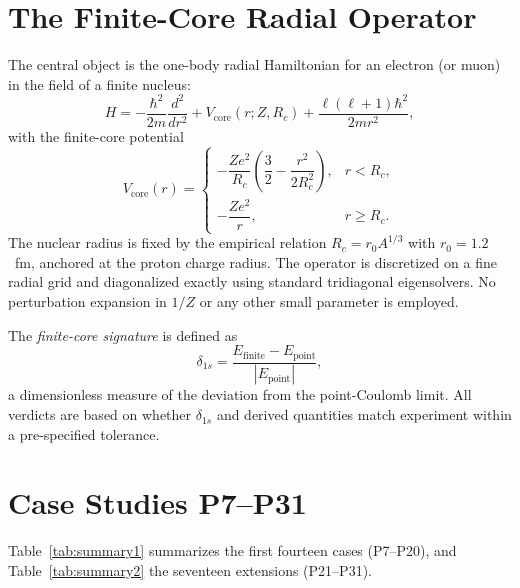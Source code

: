 \documentclass[11pt,a4paper]{article}
\begin{document}
\section{The Finite-Core Radial Operator}
\label{sec:operator}

The central object is the one-body radial Hamiltonian for an electron (or muon) in the field of a finite nucleus:
\begin{equation}
H = -\frac{\hbar^2}{2m}\frac{d^2}{dr^2} + V_{\text{core}}(r; Z, R_c) + \frac{\ell(\ell+1)\hbar^2}{2mr^2},
\end{equation}
with the finite-core potential
\begin{equation}
V_{\text{core}}(r) =
\begin{cases}
-\dfrac{Ze^2}{R_c}\left(\dfrac{3}{2} - \dfrac{r^2}{2R_c^2}\right), & r < R_c,\\[6pt]
-\dfrac{Ze^2}{r}, & r \geq R_c.
\end{cases}
\end{equation}
The nuclear radius is fixed by the empirical relation $R_c = r_0 A^{1/3}$ with $r_0 = 1.2$~fm, anchored at the proton charge radius. The operator is discretized on a fine radial grid and diagonalized exactly using standard tridiagonal eigensolvers. No perturbation expansion in $1/Z$ or any other small parameter is employed.

The \emph{finite-core signature} is defined as
\begin{equation}
\delta_{1s} = \frac{E_{\text{finite}} - E_{\text{point}}}{|E_{\text{point}}|},
\end{equation}
a dimensionless measure of the deviation from the point-Coulomb limit. All verdicts are based on whether $\delta_{1s}$ and derived quantities match experiment within a pre-specified tolerance.

\section{Case Studies P7--P31}
\label{sec:cases}

Table~\ref{tab:summary1} summarizes the first fourteen cases (P7--P20), and Table~\ref{tab:summary2} the seventeen extensions (P21--P31).
\end{document}
